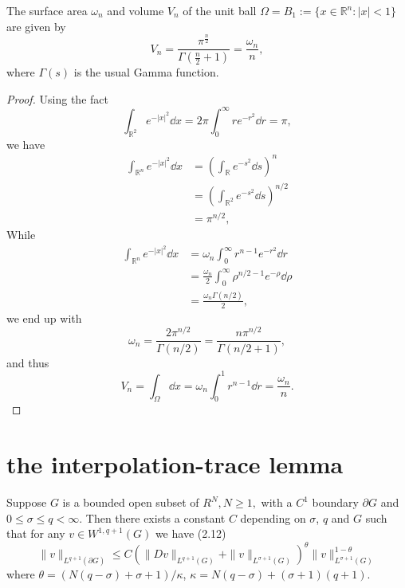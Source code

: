 \begin{lemma}
	The surface area $\omega_n$ and volume $V_n$ of the unit ball $\Omega = B_1 := \{x\in\mathbb{R}^n: |x|<1\}$ are given by
	\[
		V_n=\frac{\pi^{\frac{n}{2}}}{\Gamma\left(\frac{n}{2}+1\right)} = \frac{\omega_n}{n},
	\]
	where $\Gamma(s)$ is the usual Gamma function.
\end{lemma}
\begin{proof}
	Using the fact
	\begin{equation*}
		\int_{\mathbb{R}^2}e^{-|x|^2}\dd x 
			= 2\pi\int_0^\infty re^{-r^2}\dd r
			= \pi,
	\end{equation*}
	we have 
	\begin{align*}
		\int_{\mathbb{R}^n}e^{-|x|^2}\dd x
			&= \left(\int_{\mathbb{R}}e^{-s^2}\dd s\right)^n\\
			&= \left(\int_{\mathbb{R}^2}e^{-s^2}\dd s\right)^{n/2}\\
			&= \pi^{n/2},
	\end{align*}
	While 
	\begin{align*}
		\int_{\mathbb{R}^n}e^{-|x|^2}\dd x
			&= \omega_n\int_0^\infty r^{n-1}e^{-r^2}\dd r\\
			&= \frac{\omega_n}2\int_0^\infty \rho^{n/2-1}e^{-\rho}\dd\rho\\
			&= \frac{\omega_n\Gamma(n/2)}{2},
	\end{align*}
	we end up with
	\[
		\omega_n = \frac{2\pi^{n/2}}{\Gamma(n/2)} = \frac{n\pi^{n/2}}{\Gamma(n/2+1)},
	\]
	and thus
	\[
		V_n = \int_{\Omega}\dd x = \omega_n\int_0^1r^{n-1}\dd r = \frac{\omega_n}{n}.
	\]
\end{proof}

\section{the interpolation-trace lemma}
\begin{lemma}
	\cite{Diaz1985}
	\label{the interpolation-trace lemma}
	Suppose $G$ is a bounded open subset of $R^{N}, N \geq 1,$ with a $C^{1}$ boundary $\partial G$ and $0 \leq \sigma \leq q<\infty .$ Then there exists a constant $C$ depending on $\sigma$, $q$ and $G$ such that for any $v \in W^{1, q+1}(G)$ we have
(2.12)
\begin{equation*}
	\|v\|_{L^{q+1}(\partial G)} \leq C\left(\|D v\|_{L^{q+1}(G)}+\|v\|_{L^{\sigma+1}(G)}\right)^{\theta}\|v\|_{L^{\sigma+1}(G)}^{1-\theta}
\end{equation*}
where $\theta=(N(q-\sigma)+\sigma+1) / \kappa$, \(\kappa=N(q-\sigma)+(\sigma+1)(q+1)\).

\end{lemma}

